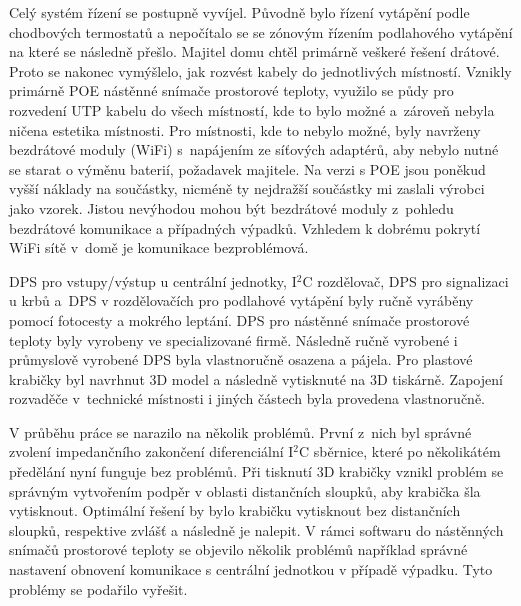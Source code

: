 Celý systém řízení se postupně vyvíjel. Původně bylo řízení vytápění podle chodbových termostatů a nepočítalo se se zónovým řízením podlahového vytápění na které se následně přešlo. Majitel domu chtěl primárně veškeré řešení drátové. Proto se nakonec vymýšlelo, jak rozvést kabely do jednotlivých místností. Vznikly primárně POE nástěnné snímače prostorové teploty, využilo se půdy pro rozvedení UTP kabelu do všech místností, kde to bylo možné a~zároveň nebyla ničena estetika místnosti. Pro místnosti, kde to nebylo možné, byly navrženy bezdrátové moduly (WiFi) s~napájením ze síťových adaptérů, aby nebylo nutné se starat o výměnu baterií, požadavek majitele. Na verzi s POE jsou poněkud vyšší náklady na součástky, nicméně ty nejdražší součástky mi zaslali výrobci jako vzorek. Jistou nevýhodou mohou být bezdrátové moduly z~pohledu bezdrátové komunikace a případných výpadků. Vzhledem k dobrému pokrytí WiFi sítě v~domě je komunikace bezproblémová.

DPS pro vstupy/výstup u centrální jednotky, I$^{2}$C rozdělovač, DPS pro signalizaci u krbů a~DPS v rozdělovačích pro podlahové vytápění byly ručně vyráběny pomocí fotocesty a mokrého leptání. DPS pro nástěnné snímače prostorové teploty byly vyrobeny ve specializované firmě. Následně ručně vyrobené i průmyslově vyrobené DPS byla vlastnoručně osazena a pájela. Pro plastové krabičky byl navrhnut 3D model a následně vytisknuté na 3D tiskárně. Zapojení rozvaděče v~technické místnosti i jiných částech byla provedena vlastnoručně.

V průběhu práce se narazilo na několik problémů. První z~nich byl správné zvolení impedančního zakončení diferenciální I$^{2}$C sběrnice, které po několikátém předělání nyní funguje bez problémů. Při tisknutí 3D krabičky vznikl problém se správným vytvořením podpěr v oblasti distančních sloupků, aby krabička šla vytisknout. Optimální řešení by bylo krabičku vytisknout bez distančních sloupků, respektive zvlášť a následně je nalepit. V rámci softwaru do nástěnných snímačů prostorové teploty se objevilo několik problémů například správné nastavení obnovení komunikace s centrální jednotkou v případě výpadku. Tyto problémy se podařilo vyřešit.

